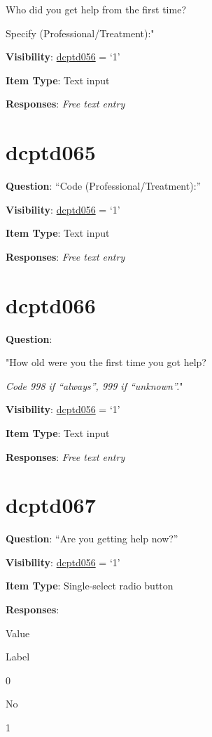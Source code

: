 \documentclass[]{book}
\begin{document}
Who did you get help from the first time?

Specify (Professional/Treatment):"

\textbf{Visibility}: \protect\hyperlink{dcptd056}{dcptd056} = `1'

\textbf{Item Type}: Text input

\textbf{Responses}: \emph{Free text entry}

\hypertarget{dcptd065}{%
\section{dcptd065}\label{dcptd065}}

\textbf{Question}: ``Code (Professional/Treatment):''

\textbf{Visibility}: \protect\hyperlink{dcptd056}{dcptd056} = `1'

\textbf{Item Type}: Text input

\textbf{Responses}: \emph{Free text entry}

\hypertarget{dcptd066}{%
\section{dcptd066}\label{dcptd066}}

\textbf{Question}:

"How old were you the first time you got help?

\emph{Code 998 if ``always'', 999 if ``unknown''.}"

\textbf{Visibility}: \protect\hyperlink{dcptd056}{dcptd056} = `1'

\textbf{Item Type}: Text input

\textbf{Responses}: \emph{Free text entry}

\hypertarget{dcptd067}{%
\section{dcptd067}\label{dcptd067}}

\textbf{Question}: ``Are you getting help now?''

\textbf{Visibility}: \protect\hyperlink{dcptd056}{dcptd056} = `1'

\textbf{Item Type}: Single-select radio button

\textbf{Responses}:

Value

Label

0

No

1
\end{document}
